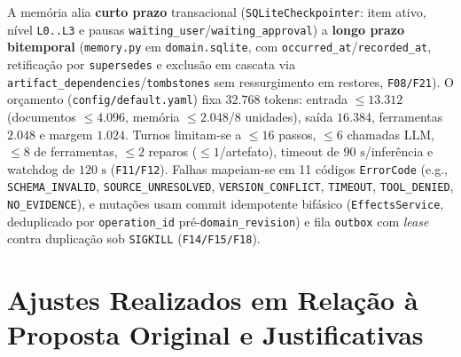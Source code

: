 \documentclass[12pt,a4paper]{article}
\newcommand{\code}[1]{\nolinkurl{#1}}
\begin{document}

A memória alia \textbf{curto prazo} transacional (\code{SQLiteCheckpointer}: item ativo, nível \code{L0..L3} e pausas \code{waiting_user}/\code{waiting_approval}) a \textbf{longo prazo bitemporal} (\code{memory.py} em \code{domain.sqlite}, com \code{occurred_at}/\code{recorded_at}, retificação por \code{supersedes} e exclusão em cascata via \code{artifact_dependencies}/\code{tombstones} sem ressurgimento em restores, \code{F08/F21}). O orçamento (\code{config/default.yaml}) fixa $32.768$ tokens: entrada $\le 13.312$ (documentos $\le 4.096$, memória $\le 2.048$/8 unidades), saída $16.384$, ferramentas $2.048$ e margem $1.024$. Turnos limitam-se a $\le 16$ passos, $\le 6$ chamadas LLM, $\le 8$ de ferramentas, $\le 2$ reparos ($\le 1$/artefato), timeout de $90\text{ s}$/inferência e watchdog de $120\text{ s}$ (\code{F11/F12}). Falhas mapeiam-se em 11 códigos \code{ErrorCode} (e.g., \code{SCHEMA_INVALID}, \code{SOURCE_UNRESOLVED}, \code{VERSION_CONFLICT}, \code{TIMEOUT}, \code{TOOL_DENIED}, \code{NO_EVIDENCE}), e mutações usam commit idempotente bifásico (\code{EffectsService}, deduplicado por \code{operation_id} pré-\code{domain_revision}) e fila \code{outbox} com \textit{lease} contra duplicação sob \code{SIGKILL} (\code{F14/F15/F18}).

\section{Ajustes Realizados em Relação à Proposta Original e Justificativas}
\label{sec:ajustes}
\end{document}
